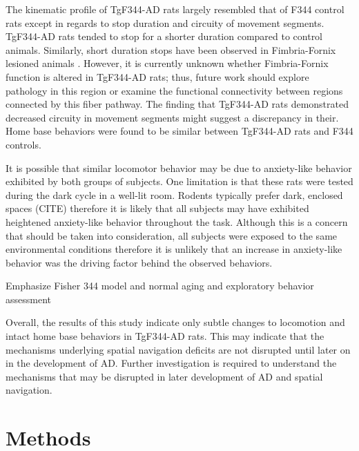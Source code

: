\documentclass[fleqn,10pt]{wlscirep}
\begin{document}
The kinematic profile of TgF344-AD rats largely resembled that of F344 control rats except in regards to stop duration and circuity of movement segments. TgF344-AD rats tended to stop for a shorter duration compared to control animals. Similarly, short duration stops have been observed in Fimbria-Fornix lesioned animals \cite{whishaw_short-stops_1994}. However, it is currently unknown whether Fimbria-Fornix function is altered in TgF344-AD rats; thus, future work should explore pathology in this region or examine the functional connectivity between regions connected by this fiber pathway. The finding that TgF344-AD rats demonstrated decreased circuity in movement segments might suggest a discrepancy in their.  
Home base behaviors were found to be similar between TgF344-AD rats and F344 controls.

It is possible that similar locomotor behavior may be due to anxiety-like behavior exhibited by both groups of subjects. One limitation is that these rats were tested during the dark cycle in a well-lit room. Rodents typically prefer dark, enclosed spaces (CITE) therefore it is likely that all subjects may have exhibited heightened anxiety-like behavior throughout the task. Although this is a concern that should be taken into consideration, all subjects were exposed to the same environmental conditions therefore it is unlikely that an increase in anxiety-like behavior was the driving factor behind the observed behaviors. 

Emphasize Fisher 344 model and normal aging and exploratory behavior assessment

Overall, the results of this study indicate only subtle changes to locomotion and intact home base behaviors in TgF344-AD rats. This may indicate that the mechanisms underlying spatial navigation deficits are not disrupted until later on in the development of AD. Further investigation is required to understand the mechanisms that may be disrupted in later development of AD and spatial navigation. 

\section*{Methods}
\end{document}
